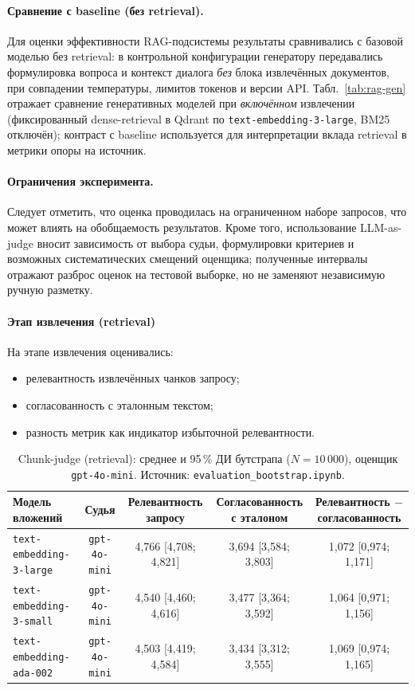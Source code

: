 \documentclass{article}
\begin{document}
\paragraph{Сравнение с baseline (без retrieval).}
Для оценки эффективности RAG-подсистемы результаты сравнивались с базовой моделью без retrieval: в контрольной конфигурации генератору передавались формулировка вопроса и контекст диалога \emph{без} блока извлечённых документов, при совпадении температуры, лимитов токенов и версии API. Табл.~\ref{tab:rag-gen} отражает сравнение генеративных моделей при \emph{включённом} извлечении (фиксированный dense-retrieval в Qdrant по \texttt{text-embedding-3-large}, BM25 отключён); контраст с baseline используется для интерпретации вклада retrieval в метрики опоры на источник.

\paragraph{Ограничения эксперимента.}
Следует отметить, что оценка проводилась на ограниченном наборе запросов, что может влиять на обобщаемость результатов. Кроме того, использование LLM-as-judge вносит зависимость от выбора судьи, формулировки критериев и возможных систематических смещений оценщика; полученные интервалы отражают разброс оценок на тестовой выборке, но не заменяют независимую ручную разметку.

\paragraph{Этап извлечения (retrieval)}

На этапе извлечения оценивались:
\begin{itemize}
\item релевантность извлечённых чанков запросу;
\item согласованность с эталонным текстом;
\item разность метрик как индикатор избыточной релевантности.
\end{itemize}

\begin{table}[ht]
\centering
\caption{Chunk-judge (retrieval): среднее и 95\,\% ДИ бутстрапа ($N{=}10\,000$), оценщик \texttt{gpt-4o-mini}. Источник: \texttt{evaluation\_bootstrap.ipynb}.}
\label{tab:rag-chunk}
\small
\setlength{\tabcolsep}{3pt}
\begin{tabular}{|l|c|c|c|c|}
\hline
Модель вложений & Судья & Релевантность запросу & Согласованность с эталоном & Релевантность $-$ согласованность \\
\hline
\texttt{text-embedding-3-large} & \texttt{gpt-4o-mini} & 4{,}766 [4{,}708; 4{,}821] & 3{,}694 [3{,}584; 3{,}803] & 1{,}072 [0{,}974; 1{,}171] \\
\hline
\texttt{text-embedding-3-small} & \texttt{gpt-4o-mini} & 4{,}540 [4{,}460; 4{,}616] & 3{,}477 [3{,}364; 3{,}592] & 1{,}064 [0{,}971; 1{,}156] \\
\hline
\texttt{text-embedding-ada-002} & \texttt{gpt-4o-mini} & 4{,}503 [4{,}419; 4{,}584] & 3{,}434 [3{,}312; 3{,}555] & 1{,}069 [0{,}974; 1{,}165] \\
\hline
\end{tabular}
\end{table}
\end{document}
